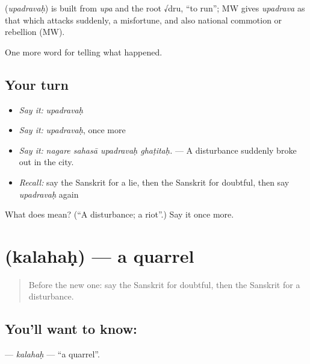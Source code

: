 \begin{cousinweb}
\textbf{} (\emph{upadravaḥ}) is built from \emph{upa} and the root √dru, \textquotedblleft{}to run\textquotedblright{}; MW gives \emph{upadrava} as that which attacks suddenly, a misfortune, and also national commotion or rebellion (MW).
\end{cousinweb}

\begin{grammarlens}[title={What you've built}]
One more word for telling what happened.
\end{grammarlens}

\subsection*{Your turn}
\begin{itemize}
\raggedright
  \item \emph{Say it:} \emph{upadravaḥ}
  \item \emph{Say it:} \emph{upadravaḥ}, once more
  \item \emph{Say it:} \emph{nagare sahasā upadravaḥ ghaṭitaḥ.} — A disturbance suddenly broke out in the city.
  \item \emph{Recall:} say the Sanskrit for a lie, then the Sanskrit for doubtful, then say \emph{upadravaḥ} again
\end{itemize}

\begin{tcolorbox}[breakable,colback=teal!4,colframe=teal!35!black,title={Before you move on}]
What does  mean? (\textquotedblleft{}A disturbance; a riot\textquotedblright{}.) Say it once more.
\end{tcolorbox}
\section[\texorpdfstring{\sk{कलहः} (kalahaḥ)}{कलहः (kalahaḥ)}]{ (kalahaḥ) — a quarrel}

\label{lesson:SA-C313-kalahah}



\begin{quote}
Before the new one: say the Sanskrit for doubtful, then the Sanskrit for a disturbance.
\end{quote}

\subsection*{You'll want to know: }
\textbf{} — \emph{kalahaḥ} — \textquotedblleft{}a quarrel\textquotedblright{}.

